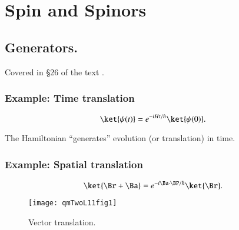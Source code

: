 %
%

\chapter{Spin and Spinors}
\label{chap:qmTwoL11}
{}
\date{Oct 17, 2011}

\beginArtWithToc

%

\section{Generators.}

Covered in \S 26 of the text \cite{desai2009quantum}.

\subsection{Example: Time translation}

\begin{equation}\label{eqn:qmTwoL11:10}
\ket{\psi(t)} = e^{-i H t/\hbar} \ket{\psi(0)} .
\end{equation}

The Hamiltonian ``generates'' evolution (or translation) in time.

\subsection{Example: Spatial translation}

\begin{equation}\label{eqn:qmTwoL11:30}
\ket{\Br + \Ba} = 
e^{-i \Ba \cdot \BP/\hbar} 
\ket{\Br}.
\end{equation}

\begin{figure}[htp]
   \centering
   \texttt{[image: qmTwoL11fig1]}
   \caption{Vector translation.}
\label{fig:qmTwoL11:qmTwoL11fig1}
\end{figure}

